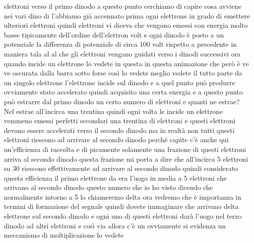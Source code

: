 {elettroni verso il primo dinodo a questo punto cerchiamo di capire cosa avviene nei vari dino di l'abbiamo già accennato prima ogni elettrone in grado di emettere ulteriori elettroni quindi elettroni vi diceva che vengono emessi con energia molto basse tipicamente dell'ordine dell'elettron volt e ogni dinodo è posto a un potenziale la differenza di potenziale di circa 100 volt rispetto a precedente in maniera tala al al che gli elettroni vengano guidati verso i dinodi successivi ora quando incide un elettrone lo vedete in questa in questa animazione che però è ve ve oscurata dalla barra sotto forse così lo vedete meglio vedete il tutto parte da un singolo elettrone l'elettrone incide sul dinodo e a quel punto può produrre ovviamente stato accelerato quindi acquisito una certa energia e a questo punto può estrarre dal primo dinodo un certo numero di elettroni e quanti ne estrae? Nel estrae all'incirca una trentina quindi ogni volta le incide un elettrone vemmeno emessi perfetti secondari una trentina di elettroni e questi elettroni devono essere accelerati verso il secondo dinodo ma in realtà non tutti questi elettroni riescono ad arrivare al secondo dinodo perché capite c'è anche qui un'efficienza di raccolta e di picamente solamente una frazione di questi elettroni arriva al secondo dinodo questa frazione mi porta a dire che all'incirca 5 elettroni su 30 riescono effettivamente ad arrivare al secondo dinodo quindi considerato questa efficienza il primo elettrone da era l'uogo in media a 5 elettroni che arrivano al secondo dinodo questo numero che io ho visto dicendo che normalmente intorno a 5 lo chiameremo delta ora vedremo che è importanza in termini di formazione del segnale quindi dovete immaginare che arrivano delta elettrone sul secondo dinodo e ogni uno di questi elettroni darà l'uogo nel terzo dinodo ad altri elettroni e così via allora c'è un ovviamente si evidenza un meccanismo di moltiplicazione lo vedete

}
